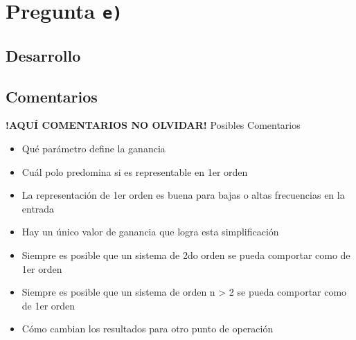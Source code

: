 \section{Pregunta \texttt{e)}}\label{pregunta-e}
\subsection{Desarrollo}





\FloatBarrier
\subsection{Comentarios}


\textbf{!AQUÍ COMENTARIOS NO OLVIDAR!}
Posibles Comentarios
\begin{itemize}
    \item Qué parámetro define la ganancia
    \item Cuál polo predomina si es representable en 1er orden
    \item La representación de 1er orden es buena para bajas o altas frecuencias en la entrada
    \item Hay un único valor de ganancia que logra esta simplificación
    \item Siempre es posible que un sistema de 2do orden se pueda comportar como de 1er orden
    \item Siempre es posible que un sistema de orden n > 2 se pueda comportar como de 1er orden
    \item Cómo cambian los resultados para otro punto de operación
\end{itemize}